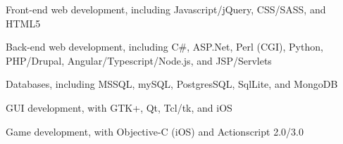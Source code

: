 \begin{plainlist}
	\item Front-end web development, including Javascript/jQuery, CSS/SASS, and HTML5
	\item Back-end web development, including C\#, ASP.Net, Perl (CGI), Python, PHP/Drupal, Angular/Typescript/Node.js, and JSP/Servlets
	\item Databases, including MSSQL, mySQL, PostgresSQL, SqlLite, and MongoDB
	\item GUI development, with GTK+, Qt, Tcl/tk, and iOS
	\item Game development, with Objective-C (iOS) and Actionscript 2.0/3.0
\end{plainlist}
